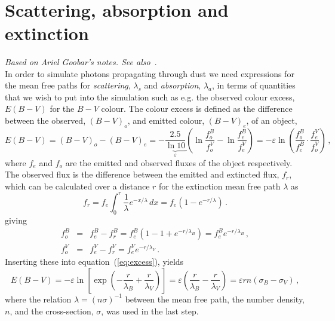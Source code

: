 \documentclass[a4paper,12pt]{article}
\begin{document}
\begin{centering}
\\
\end{centering}
\hspace{2ex}

\section*{Scattering, absorption and extinction}
\emph{Based on Ariel Goobar's notes. See
  also~\cite{2008ApJ...686L.103G}}.\hfill\\[2ex]
In order to simulate photons propagating through dust we need
expressions for the mean free paths for \emph{scattering}, $\lambda_s$
and \emph{absorption}, $\lambda_a$, in terms of quantities that we wish
to put into the simulation such as e.g. the observed colour excess,
$E(B-V)$ for the $B-V$ colour. The colour excess is defined as the
difference between the observed, $(B-V)_o$, and emitted colour,
$(B-V)_e$, of an object,
\begin{equation}
E(B-V) = (B-V)_o - (B-V)_e =
-\underbrace{\frac{2.5}{\ln10}}_\varepsilon\left(\ln\frac{f_o^B}{f_o^V}
  -\ln\frac{f_e^B}{f_e^V}\right) = 
  -\varepsilon\ln\left(\frac{f_o^B}{f_e^B}\cdot\frac{f_e^V}{f_o^V}\right)\,,
\label{eq:excess}
\end{equation}
where $f_e$ and $f_o$ are the emitted and observed fluxes of the
object respectively. The observed flux is the difference between the
emitted and extincted flux, $f_r$, which can be calculated over a
distance $r$ for the extinction mean free path $\lambda$ as
\[
f_r = f_e\int_0^r\frac{1}{\lambda}e^{-x/\lambda}\, dx =
f_e\left(1-e^{-r/\lambda}\right)\, .
\]
giving
\begin{eqnarray*}
  f_o^B & = & f_e^B - f_r^B =
    f_e^B\left(1 - 1 +e^{-r/\lambda_B}\right) = f_e^Be^{-r/\lambda_B}\,,\\
  f_o^V & = & f_e^V - f_r^V = f_e^Ve^{-r/\lambda_V}\,.
\end{eqnarray*}
Inserting these into equation~(\ref{eq:excess}), yields
\begin{equation}
E(B-V) = -\varepsilon\ln\left[\exp\left(-\frac{r}{\lambda_B} + 
    \frac{r}{\lambda_V}\right)\right] =
\varepsilon\left(\frac{r}{\lambda_B} - \frac{r}{\lambda_V}\right) =
\varepsilon rn\left(\sigma_B - \sigma_V\right)\,,
\label{eq:excess2}
\end{equation}
where the relation $\lambda = (n\sigma)^{-1}$ between the mean free
path, the number density, $n$, and the cross-section, $\sigma$, was
used in the last step.
\end{document}

